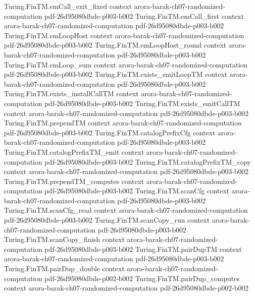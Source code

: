 \begin{theorem}
\proofstep
  {Turing.FinTM.emCall_exit_fixed}
  {context}
  {arora-barak-ch07-randomized-computation}
  {pdf-26d95080dbde-p003-b002}
\proofstep
  {Turing.FinTM.emCall_first}
  {context}
  {arora-barak-ch07-randomized-computation}
  {pdf-26d95080dbde-p003-b002}
\proofstep
  {Turing.FinTM.emLoopHost}
  {context}
  {arora-barak-ch07-randomized-computation}
  {pdf-26d95080dbde-p003-b002}
\proofstep
  {Turing.FinTM.emLoopHost_round}
  {context}
  {arora-barak-ch07-randomized-computation}
  {pdf-26d95080dbde-p003-b002}
\proofstep
  {Turing.FinTM.emLoop_sum}
  {context}
  {arora-barak-ch07-randomized-computation}
  {pdf-26d95080dbde-p003-b002}
\proofstep
  {Turing.FinTM.exists_emitLoopTM}
  {context}
  {arora-barak-ch07-randomized-computation}
  {pdf-26d95080dbde-p003-b002}
\proofstep
  {Turing.FinTM.exists_installCallTM}
  {context}
  {arora-barak-ch07-randomized-computation}
  {pdf-26d95080dbde-p003-b002}
\proofstep
  {Turing.FinTM.exists_emitCallTM}
  {context}
  {arora-barak-ch07-randomized-computation}
  {pdf-26d95080dbde-p003-b002}
\proofstep
  {Turing.FinTM.prependTM}
  {context}
  {arora-barak-ch07-randomized-computation}
  {pdf-26d95080dbde-p003-b002}
\proofstep
  {Turing.FinTM.catalogPrefixCfg}
  {context}
  {arora-barak-ch07-randomized-computation}
  {pdf-26d95080dbde-p003-b002}
\proofstep
  {Turing.FinTM.catalogPrefixTM_emit}
  {context}
  {arora-barak-ch07-randomized-computation}
  {pdf-26d95080dbde-p003-b002}
\proofstep
  {Turing.FinTM.catalogPrefixTM_copy}
  {context}
  {arora-barak-ch07-randomized-computation}
  {pdf-26d95080dbde-p003-b002}
\proofstep
  {Turing.FinTM.prependTM_computes}
  {context}
  {arora-barak-ch07-randomized-computation}
  {pdf-26d95080dbde-p003-b002}
\proofstep
  {Turing.FinTM.scanCfg}
  {context}
  {arora-barak-ch07-randomized-computation}
  {pdf-26d95080dbde-p003-b002}
\proofstep
  {Turing.FinTM.scanCfg_read}
  {context}
  {arora-barak-ch07-randomized-computation}
  {pdf-26d95080dbde-p003-b002}
\proofstep
  {Turing.FinTM.scanCopy_run}
  {context}
  {arora-barak-ch07-randomized-computation}
  {pdf-26d95080dbde-p003-b002}
\proofstep
  {Turing.FinTM.scanCopy_finish}
  {context}
  {arora-barak-ch07-randomized-computation}
  {pdf-26d95080dbde-p003-b002}
\proofstep
  {Turing.FinTM.pairDupTM}
  {context}
  {arora-barak-ch07-randomized-computation}
  {pdf-26d95080dbde-p003-b002}
\proofstep
  {Turing.FinTM.pairDup_double}
  {context}
  {arora-barak-ch07-randomized-computation}
  {pdf-26d95080dbde-p002-b002}
\proofstep
  {Turing.FinTM.pairDup_computes}
  {context}
  {arora-barak-ch07-randomized-computation}
  {pdf-26d95080dbde-p002-b002}

\end{theorem}
